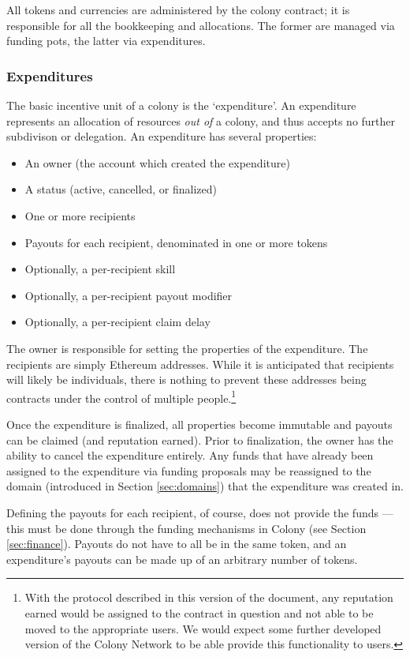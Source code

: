 All tokens and currencies are administered by the colony contract; it is responsible for all the bookkeeping and allocations. The former are managed via funding pots, the latter via expenditures.

\subsubsection{Expenditures}

The basic incentive unit of a colony is the `expenditure'. An expenditure represents an allocation of resources \textit{out of} a colony, and thus accepts no further subdivison or delegation. An expenditure has several properties:

\begin{itemize}
\item An owner (the account which created the expenditure)
\item A status (active, cancelled, or finalized)
\item One or more recipients
\item Payouts for each recipient, denominated in one or more tokens
\item Optionally, a per-recipient skill
\item Optionally, a per-recipient payout modifier
\item Optionally, a per-recipient claim delay
\end{itemize}

The owner is responsible for setting the properties of the expenditure. The recipients are simply Ethereum addresses. While it is anticipated that recipients will likely be individuals, there is nothing to prevent these addresses being contracts under the control of multiple people.\footnote{With the protocol described in this version of the document, any reputation earned would be assigned to the contract in question and not able to be moved to the appropriate users. We would expect some further developed version of the Colony Network to be able provide this functionality to users.}

Once the expenditure is finalized, all properties become immutable and payouts can be claimed (and reputation earned). Prior to finalization, the owner has the ability to cancel the expenditure entirely. Any funds that have already been assigned to the expenditure via funding proposals may be reassigned to the domain (introduced in Section \ref{sec:domains}) that the expenditure was created in.

Defining the payouts for each recipient, of course, does not provide the funds --- this must be done through the funding mechanisms in Colony (see Section \ref{sec:finance}). Payouts do not have to all be in the same token, and an expenditure's payouts can be made up of an arbitrary number of tokens.

